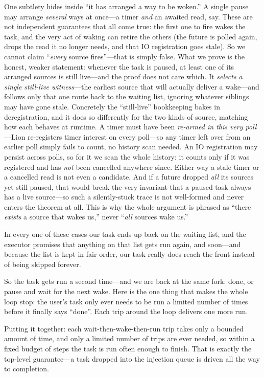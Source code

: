 \documentclass[11pt]{article}
\newcommand{\asm}[1]{\textcolor{cAssume}{#1}}
\newcommand{\inv}[1]{\textcolor{cInv}{#1}}
\newcommand{\ctr}[1]{\textcolor{cContract}{#1}}
\theoremstyle{plain}
\theoremstyle{definition}
\begin{document}
\noindent One subtlety hides inside ``it has arranged a way to be woken.'' A single pause
may arrange \emph{several} ways at once---a timer \emph{and} an awaited read, say. These
are not independent guarantees that all come true: the first one to fire wakes the task,
and the very act of waking can retire the others (the future is polled again, drops the
read it no longer needs, and that IO registration goes stale). So we cannot claim
``\emph{every} source fires''---that is simply false. What we prove is the honest,
weaker statement: \inv{whenever the task is paused, at least one of its arranged sources is
still live}---and the proof does not care which. It \emph{selects a single still-live
witness}---the earliest source that will actually deliver a wake---and follows only that one
route back to the waiting list, ignoring whatever siblings may have gone stale. Concretely
the ``still-live'' bookkeeping bakes in deregistration, and it does so differently for the
two kinds of source, matching how each behaves at runtime. \inv{A timer must have been
\emph{re-armed in this very poll}}---Lion re-registers timer interest on every poll---so any
timer left over from an earlier poll simply fails to count, no history scan needed. \inv{An
IO registration may persist across polls, so for it we scan the whole history: it counts
only if it was registered and has \emph{not} been cancelled anywhere since.} Either way a
stale timer or a cancelled read is not even a candidate. And if a future dropped \emph{all}
its sources yet still paused, that would break the very invariant that a paused task always
has a live source---so \inv{such a silently-stuck trace is not well-formed and never enters
the theorem at all}. This is why the whole argument is phrased as ``there \emph{exists} a
source that wakes us,'' never ``\emph{all} sources wake us.''

\noindent In every one of these cases our task ends up back on the waiting list, and
\ctr{the executor promises that anything on that list gets run again, and soon}---\inv{and
because the list is kept in fair order, our task really does reach the front} instead of
being skipped forever.

So the task gets run a second time---and we are back at the same fork: done, or pause and
wait for the next wake. Here is the one thing that makes the whole loop stop: \asm{the
user's task only ever needs to be run a limited number of times before it finally says
``done''}. Each trip around the loop delivers one more run.

Putting it together: \asm{each wait-then-wake-then-run trip takes only a bounded amount of
time}, and \asm{only a limited number of trips are ever needed}, so within a fixed budget of
steps the task is run often enough to finish. That is exactly the top-level guarantee---a
task dropped into the injection queue is driven all the way to completion.
\end{document}
